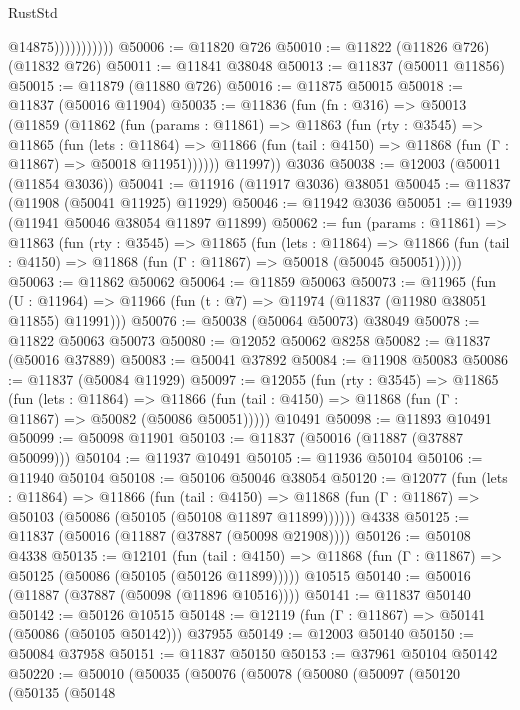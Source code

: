 \begin{lexlean}{RustStd}
\begin{coremodule}
                          @14875)))))))))))
@50006 := @11820 @726
@50010 := @11822 (@11826 @726) (@11832 @726)
@50011 := @11841 @38048
@50013 := @11837 (@50011 @11856)
@50015 := @11879 (@11880 @726)
@50016 := @11875 @50015
@50018 := @11837 (@50016 @11904)
@50035 := @11836
    (fun (fn : @316) =>
    @50013
      (@11859
        (@11862
          (fun (params : @11861) =>
          @11863
            (fun (rty : @3545) =>
            @11865
              (fun (lets : @11864) =>
              @11866 (fun (tail : @4150) => @11868 (fun (Γ : @11867) => @50018 @11951))))))
        @11997))
    @3036
@50038 := @12003 (@50011 (@11854 @3036))
@50041 := @11916 (@11917 @3036) @38051
@50045 := @11837 (@11908 (@50041 @11925) @11929)
@50046 := @11942 @3036
@50051 := @11939 (@11941 @50046 @38054 @11897 @11899)
@50062 := fun (params : @11861) =>
  @11863
    (fun (rty : @3545) =>
    @11865
      (fun (lets : @11864) =>
      @11866 (fun (tail : @4150) => @11868 (fun (Γ : @11867) => @50018 (@50045 @50051)))))
@50063 := @11862 @50062
@50064 := @11859 @50063
@50073 := @11965
    (fun (U : @11964) => @11966 (fun (t : @7) => @11974 (@11837 (@11980 @38051 @11855) @11991)))
@50076 := @50038 (@50064 @50073) @38049
@50078 := @11822 @50063 @50073
@50080 := @12052 @50062 @8258
@50082 := @11837 (@50016 @37889)
@50083 := @50041 @37892
@50084 := @11908 @50083
@50086 := @11837 (@50084 @11929)
@50097 := @12055
    (fun (rty : @3545) =>
    @11865
      (fun (lets : @11864) =>
      @11866 (fun (tail : @4150) => @11868 (fun (Γ : @11867) => @50082 (@50086 @50051)))))
    @10491
@50098 := @11893 @10491
@50099 := @50098 @11901
@50103 := @11837 (@50016 (@11887 (@37887 @50099)))
@50104 := @11937 @10491
@50105 := @11936 @50104
@50106 := @11940 @50104
@50108 := @50106 @50046 @38054
@50120 := @12077
    (fun (lets : @11864) =>
    @11866
      (fun (tail : @4150) =>
      @11868 (fun (Γ : @11867) => @50103 (@50086 (@50105 (@50108 @11897 @11899))))))
    @4338
@50125 := @11837 (@50016 (@11887 (@37887 (@50098 @21908))))
@50126 := @50108 @4338
@50135 := @12101
    (fun (tail : @4150) => @11868 (fun (Γ : @11867) => @50125 (@50086 (@50105 (@50126 @11899)))))
    @10515
@50140 := @50016 (@11887 (@37887 (@50098 (@11896 @10516))))
@50141 := @11837 @50140
@50142 := @50126 @10515
@50148 := @12119 (fun (Γ : @11867) => @50141 (@50086 (@50105 @50142))) @37955
@50149 := @12003 @50140
@50150 := @50084 @37958
@50151 := @11837 @50150
@50153 := @37961 @50104 @50142
@50220 := @50010
    (@50035
      (@50076
        (@50078
          (@50080
            (@50097
              (@50120
                (@50135
                  (@50148

\end{coremodule}
\end{lexlean}
